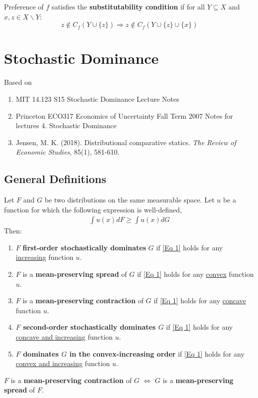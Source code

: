 \documentclass[11pt]{elegantbook}
\begin{document}
\begin{definition}
    \normalfont
    Preference of $f$ satisfies the \textbf{substitutability condition} if for all $Y\subseteq X$ and $x,z\in X\backslash Y$:
    $$z\notin C_f(Y\cup\{z\}) \Rightarrow z\notin C_f(Y\cup\{z\}\cup\{x\})$$
\end{definition}



\chapter{Stochastic Dominance}
Based on
\begin{enumerate}[$\circ$]
    \item MIT 14.123 S15 Stochastic Dominance Lecture Notes
    \item Princeton ECO317 Economics of Uncertainty Fall Term 2007 Notes for lectures 4. Stochastic Dominance
    \item Jensen, M. K. (2018). Distributional comparative statics. \textit{The Review of Economic Studies}, 85(1), 581-610.
\end{enumerate}

\section{General Definitions}
\begin{definition}\label{Defn SD}
    \normalfont
    Let $F$ and $G$ be two distributions on the same measurable space. Let $u$ be a function for which the following expression is well-defined,
    \begin{equation}
        \begin{aligned}
            \int u(x)dF\geq \int u(x)dG
        \end{aligned}
        \label{Eq 1}
    \end{equation}
    Then:
    \begin{enumerate}[$\bullet$]
        \item $F$ \textbf{first-order stochastically dominates} $G$ if \ref{Eq 1} holds for any \underline{increasing} function $u$.
        \item $F$ is a \textbf{mean-preserving spread} of $G$ if \ref{Eq 1} holds for any \underline{convex} function $u$.
        \item $F$ is a \textbf{mean-preserving contraction} of $G$ if \ref{Eq 1} holds for any \underline{concave} function $u$.
        \item \textbf{$F$ second-order stochastically dominates $G$} if \ref{Eq 1} holds for any \underline{concave and increasing} function $u$.
        \item \textbf{$F$ dominates $G$ in the convex-increasing order} if \ref{Eq 1} holds for any \underline{convex and increasing} function $u$.
    \end{enumerate}
\end{definition}
\begin{note}
    $F$ is a \textbf{mean-preserving contraction} of $G$ $\Leftrightarrow$ $G$ is a \textbf{mean-preserving spread} of $F$.
\end{note}
\end{document}

